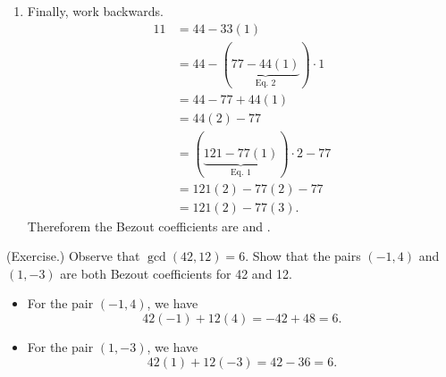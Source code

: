 \documentclass[letterpaper]{article}
\newcommand{\0}{\mathbf{0}}
\begin{document}
\begin{mdframed}
\begin{itemize}
\begin{mdframed}
\begin{enumerate}
                \item Finally, work backwards. 
                \begin{equation*}
                    \begin{aligned}
                        11 &= 44 - 33(1) \\ 
                            &= 44 - (\underbrace{77 - 44(1)}_{\text{Eq. 2}}) \cdot 1 \\
                            &= 44 - 77 + 44(1) \\ 
                            &= 44(2) - 77 \\ 
                            &= (\underbrace{121 - 77(1)}_{\text{Eq. 1}}) \cdot 2 - 77 \\ 
                            &= 121(2) - 77(2) - 77 \\ 
                            &= 121(2) - 77(3).
                    \end{aligned}
                \end{equation*}
                Thereforem the Bezout coefficients are  and .
            \end{enumerate}
        \end{mdframed}
    \end{itemize}
\end{mdframed}

\begin{mdframed}
    (Exercise.) Observe that $\gcd(42, 12) = 6$. Show that the pairs $(-1, 4)$ and $(1, -3)$ are both Bezout coefficients for 42 and 12. 

    \begin{mdframed}
        \begin{itemize}
            \item For the pair $(-1, 4)$, we have 
            \[42(-1) + 12(4) = -42 + 48 = 6.\]

            \item For the pair $(1, -3)$, we have 
            \[42(1) + 12(-3) = 42 - 36 = 6.\]
        \end{itemize}
    \end{mdframed}
\end{mdframed}
\end{document}

